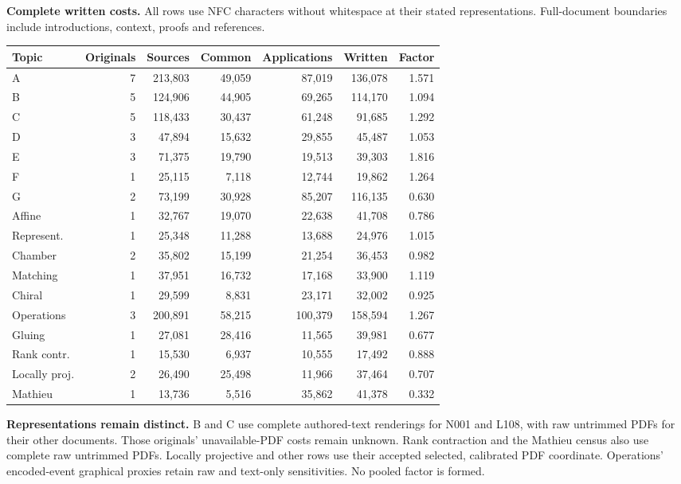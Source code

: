 \documentclass[11pt,a4paper]{article}
\newcommand{\tabsetup}{\small\setlength{\tabcolsep}{4pt}\renewcommand{\arraystretch}{1.10}}
\begin{document}
\textbf{Complete written costs.} All rows use NFC characters without whitespace at their stated representations. Full-document boundaries include introductions, context, proofs and references.
\begin{center}\tabsetup\begin{tabular}{lrrrrrr}\toprule
Topic & Originals & Sources & Common & Applications & Written & Factor\\\midrule
A & 7 & 213,803 & 49,059 & 87,019 & 136,078 & 1.571 \\
B & 5 & 124,906 & 44,905 & 69,265 & 114,170 & 1.094 \\
C & 5 & 118,433 & 30,437 & 61,248 & 91,685 & 1.292 \\
D & 3 & 47,894 & 15,632 & 29,855 & 45,487 & 1.053 \\
E & 3 & 71,375 & 19,790 & 19,513 & 39,303 & 1.816 \\
F & 1 & 25,115 & 7,118 & 12,744 & 19,862 & 1.264 \\
G & 2 & 73,199 & 30,928 & 85,207 & 116,135 & 0.630 \\
Affine & 1 & 32,767 & 19,070 & 22,638 & 41,708 & 0.786 \\
Represent. & 1 & 25,348 & 11,288 & 13,688 & 24,976 & 1.015 \\
Chamber & 2 & 35,802 & 15,199 & 21,254 & 36,453 & 0.982 \\
Matching & 1 & 37,951 & 16,732 & 17,168 & 33,900 & 1.119 \\
Chiral & 1 & 29,599 & 8,831 & 23,171 & 32,002 & 0.925 \\
Operations & 3 & 200,891 & 58,215 & 100,379 & 158,594 & 1.267 \\
Gluing & 1 & 27,081 & 28,416 & 11,565 & 39,981 & 0.677 \\
Rank contr. & 1 & 15,530 & 6,937 & 10,555 & 17,492 & 0.888 \\
Locally proj. & 2 & 26,490 & 25,498 & 11,966 & 37,464 & 0.707 \\
Mathieu & 1 & 13,736 & 5,516 & 35,862 & 41,378 & 0.332 \\
\bottomrule\end{tabular}\end{center}
\textbf{Representations remain distinct.} B and C use complete authored-text renderings for N001 and L108, with raw untrimmed PDFs for their other documents. Those originals' unavailable-PDF costs remain unknown. Rank contraction and the Mathieu census also use complete raw untrimmed PDFs. Locally projective and other rows use their accepted selected, calibrated PDF coordinate. Operations' encoded-event graphical proxies retain raw and text-only sensitivities. No pooled factor is formed.
\end{document}
